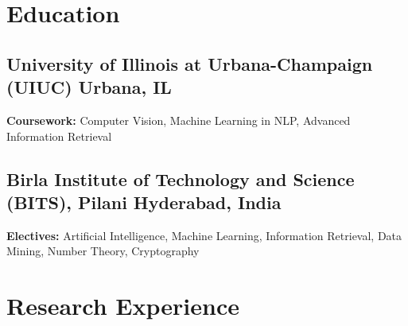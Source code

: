 \documentclass[]{Keval-resume}
\begin{document}
%
%

\descript{}
\postsectionsep

\section{Education}
\hrulefill
\postsectionsep

\subsection{University of Illinois at Urbana-Champaign (UIUC) \hfill \normalfont U\lowercase{rbana}, IL}
\textbf{Coursework:} Computer Vision, Machine Learning in NLP, Advanced Information Retrieval
\sectionsep

\subsection{Birla Institute of Technology and Science (BITS), Pilani \hfill \normalfont H\lowercase{yderabad}, I\lowercase{ndia}}
\textbf{Electives:} Artificial Intelligence, Machine Learning, Information Retrieval, Data Mining, Number Theory, Cryptography

\sectionsep

\section{Research Experience} 
\hrulefill
\postsectionsep 
\end{document}
